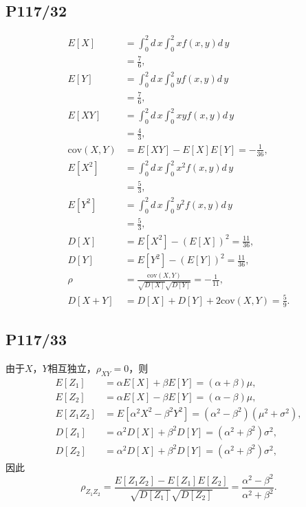 \documentclass[UTF8,a4paper,10pt]{ctexart}
\def\deriv{d\,}
\begin{document}
\subsection{P117/32}
\begin{align}
    E[X] &= \int_{0}^2\deriv x\int_0^2xf(x,y)\deriv y \nonumber \\
         &= \frac{7}{6}, \\
    E[Y] &= \int_{0}^2\deriv x\int_0^2yf(x,y)\deriv y \nonumber \\
         &= \frac{7}{6}, \\
    E[XY] &= \int_{0}^2\deriv x\int_0^2xyf(x,y)\deriv y \nonumber \\
          &= \frac{4}{3}, \\
    \mathrm{cov}(X,Y) &= E[XY] - E[X]E[Y] = -\frac{1}{36}, \\
    E[X^2] &= \int_{0}^2\deriv x\int_0^2x^2f(x,y)\deriv y \nonumber \\
           &= \frac{5}{3}, \\
    E[Y^2] &= \int_{0}^2\deriv x\int_0^2y^2f(x,y)\deriv y \nonumber \\
           &= \frac{5}{3}, \\
    D[X] &= E[X^2] - (E[X])^2 = \frac{11}{36}, \\
    D[Y] &= E[Y^2] - (E[Y])^2 = \frac{11}{36}, \\
    \rho &= \frac{\mathrm{cov}(X, Y)}{\sqrt{D[X]}\sqrt{D[Y]}} = -\frac{1}{11}, \\
    D[X + Y] &= D[X] + D[Y] + 2\mathrm{cov}(X, Y) = \frac{5}{9}.
\end{align}

\subsection{P117/33}
由于$X$，$Y$相互独立，$\rho_{XY} = 0$，则
\begin{align}
    E[Z_1] &= \alpha E[X] + \beta E[Y] = (\alpha + \beta)\mu, \\
    E[Z_2] &= \alpha E[X] - \beta E[Y] = (\alpha - \beta)\mu, \\
    E[Z_1Z_2] &= E[\alpha^2X^2 - \beta^2 Y^2] = (\alpha^2 - \beta^2)(\mu^2 + \sigma^2), \\
    D[Z_1] &= \alpha^2 D[X] + \beta^2 D[Y] = (\alpha^2 + \beta^2)\sigma^2, \\
    D[Z_2] &= \alpha^2 D[X] + \beta^2 D[Y] = (\alpha^2 + \beta^2)\sigma^2,
\end{align}
因此
\begin{equation}
    \rho_{Z_1Z_2} = \frac{E[Z_1Z_2] - E[Z_1]E[Z_2]}{\sqrt{D[Z_1]}\sqrt{D[Z_2]}} =\frac{\alpha^2 - \beta^2}{\alpha^2 + \beta^2}.
\end{equation}
\end{document}

